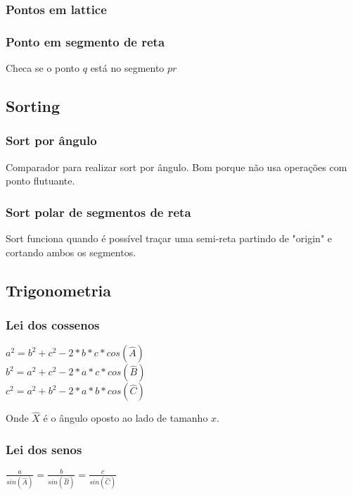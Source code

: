 \subsubsection{Pontos em lattice}
\divisor

\subsubsection{Ponto em segmento de reta}
Checa se o ponto $q$ est\'{a} no segmento $pr$
\divisor


\subsection{Sorting}
\subsubsection{Sort por \^{a}ngulo}
Comparador para realizar sort por \^{a}ngulo. Bom porque n\~{a}o usa opera\c{c}\~{o}es com ponto flutuante.
\divisor

\subsubsection{Sort polar de segmentos de reta}
Sort funciona quando \'{e} poss\'{i}vel tra\c{c}ar uma semi-reta partindo de "origin" e cortando ambos os segmentos.
\divisor


\subsection{Trigonometria}

\subsubsection{Lei dos cossenos}

$a^2 = b^2 + c^2 - 2*b*c*cos(\hat{A})$
\\$b^2 = a^2 + c^2 - 2*a*c*cos(\hat{B})$
\\$c^2 = a^2 + b^2 - 2*a*b*cos(\hat{C})$

Onde $\hat{X}$ \'{e} o \^{a}ngulo oposto ao lado de tamanho $x$.
\divisor

\subsubsection{Lei dos senos}
$\frac{a}{sin(\hat{A})} = \frac{b}{sin(\hat{B})} = \frac{c}{sin(\hat{C})}$
\divisor
